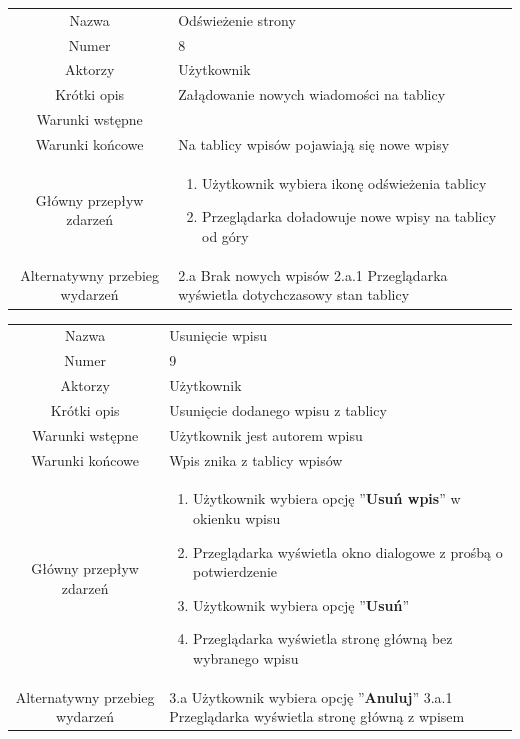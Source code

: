 \documentclass[a4paper]{article}
\begin{document}
\newline
\newline
\begin{tabular}{c p{10cm}}
Nazwa& Odświeżenie strony\\
Numer	& 8\\
Aktorzy &	Użytkownik\\
Krótki opis & Załądowanie nowych wiadomości na tablicy\\
Warunki wstępne& \\
Warunki końcowe& Na tablicy wpisów pojawiają się nowe wpisy\\
Główny przepływ zdarzeń&
\begin{enumerate}
\item Użytkownik wybiera ikonę odświeżenia tablicy
\item Przeglądarka doładowuje nowe wpisy na tablicy od góry
\end{enumerate} \\

Alternatywny przebieg wydarzeń & 
2.a Brak nowych wpisów \newline 
2.a.1 Przeglądarka wyświetla dotychczasowy stan tablicy
\\
\hline
\end{tabular}
\newline
\newline
\begin{tabular}{c p{10cm}}
Nazwa& Usunięcie wpisu\\
Numer	& 9\\
Aktorzy &	Użytkownik\\
Krótki opis & Usunięcie dodanego wpisu z tablicy\\
Warunki wstępne& Użytkownik jest autorem wpisu\\
Warunki końcowe& Wpis znika z tablicy wpisów\\
Główny przepływ zdarzeń&
\begin{enumerate}
\item Użytkownik wybiera opcję ''\textbf{Usuń wpis}'' w okienku wpisu
\item Przeglądarka wyświetla okno dialogowe z prośbą o potwierdzenie
\item Użytkownik wybiera opcję ''\textbf{Usuń}''
\item Przeglądarka wyświetla stronę główną bez wybranego wpisu
\end{enumerate} \\

Alternatywny przebieg wydarzeń & 
3.a Użytkownik wybiera opcję ''\textbf{Anuluj}'' \newline 
3.a.1 Przeglądarka wyświetla stronę główną z wpisem
\\
\hline
\end{tabular}
\end{document}
